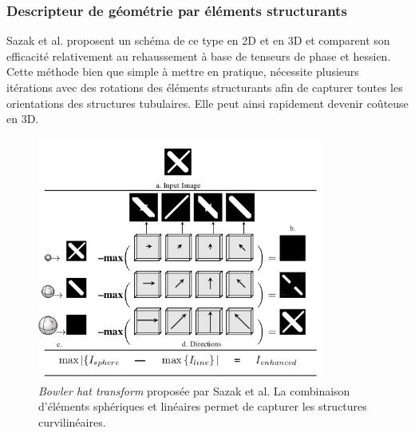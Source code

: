 \subsubsection{Descripteur de géométrie par éléments structurants}
\label{sec:EA:rehaussement:morpho}
 Sazak et al. proposent un schéma de ce type en 2D \cite{Sazak2019_bowler_hat_2D} et en 3D \cite{Sazak2018_bowler_hat_3D} et comparent son efficacité relativement au rehaussement à base de tenseurs de phase et hessien. Cette méthode bien que simple à mettre en pratique, nécessite plusieurs itérations avec des rotations des éléments structurants afin de capturer toutes les orientations des structures tubulaires. Elle peut ainsi rapidement devenir coûteuse en 3D.
\begin{figure}[!ht]
\centering
\includegraphics[height=8cm]{Images/bowlerHat_3D.png}
\caption{\textit{Bowler hat transform} proposée par Sazak et al. \cite{Sazak2018_bowler_hat_3D} La combinaison d'éléments sphériques et linéaires permet de capturer les structures curvilinéaires. }
\label{fig:sazak_bowler_hat}
\end{figure}


